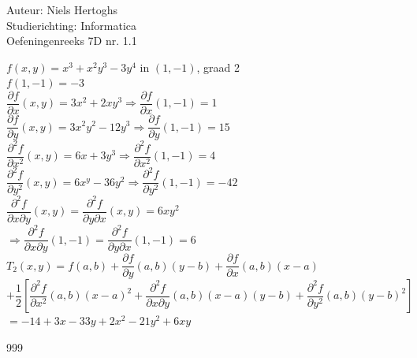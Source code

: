 \documentclass[a4paper]{article}
\begin{document}
  
\noindent \large Auteur: Niels Hertoghs \\
\noindent \large Studierichting: Informatica\\
\noindent \large Oefeningenreeks 7D nr. 1.1\\

\medskip

\normalsize

$f(x,y) = x^3 + x^2y^3-3y^4$ in $(1,-1)$, graad 2\\

$f(1,-1) = -3$\\

$\dfrac{\partial f}{\partial x}(x,y) = 3x^2+2xy^3 \Rightarrow \dfrac{\partial f}{\partial x}(1,-1) = 1$\\

$\dfrac{\partial f}{\partial y}(x,y) = 3x^2y^2-12y^3 \Rightarrow \dfrac{\partial f}{\partial y}(1,-1) = 15$\\

$\dfrac{\partial^2 f}{\partial x^2}(x,y) = 6x+3y^3 \Rightarrow \dfrac{\partial^2 f}{\partial x^2}(1,-1) = 4$\\

$\dfrac{\partial^2 f}{\partial y^2}(x,y) = 6x^y-36y^2 \Rightarrow \dfrac{\partial^2 f}{\partial y^2}(1,-1) = -42$\\

$\dfrac{\partial^2 f}{\partial x \partial y}(x,y) = \dfrac{\partial^2 f}{\partial y \partial x}(x,y) = 6xy^2$\\

$\Rightarrow \dfrac{\partial^2 f}{\partial x \partial y}(1,-1) = \dfrac{\partial^2 f}{\partial y \partial x}(1,-1) = 6$\\

$T_2(x,y) = f(a,b) + \dfrac{\partial f}{\partial y}(a,b)(y-b) + \dfrac{\partial f}{\partial x}(a,b)(x-a)$\\

$  + \dfrac{1}{2}\left[\dfrac{\partial^2 f}{\partial x^2}(a,b)(x-a)^2 + \dfrac{\partial^2 f}{\partial x \partial y}(a,b)(x-a)(y-b) + \dfrac{\partial^2 f}{\partial y^2}(a,b)(y-b)^2\right]$\\

$ = -14 +3x -33y +2x^2 -21y^2 + 6xy$\\

\begin{thebibliography}{999}
\end{thebibliography}
\end{document}
